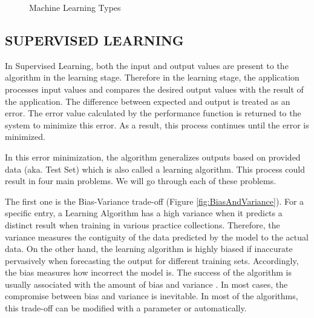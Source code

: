\begin{figure}[htbp]
\centering
{}
\caption{Machine Learning Types}
\label{fig:MachineLearningTypes}
\end{figure}

\subsection{SUPERVISED LEARNING}

In Supervised Learning, both the input and output values are present to the algorithm in the learning stage. Therefore in the learning stage, the application processes input values and compares the desired output values with the result of the application. The difference between expected and output is treated as an error. The error value calculated by the performance function is returned to the system to minimize this error. As a result, this process continues until the error is minimized.

In this error minimization, the algorithm generalizes outputs based on provided data (aka. Test Set) which is also called a learning algorithm. This process could result in four main problems. We will go through each of these problems. 

The first one is the Bias-Variance trade-off \cite{geman1992neural} (Figure \ref{fig:BiasAndVariance}). For a specific entry, a Learning Algorithm has a high variance when it predicts a distinct result when training in various practice collections. Therefore, the variance measures the contiguity of the data predicted by the model to the actual data. On the other hand, the learning algorithm is highly biased if inaccurate pervasively when forecasting the output for different training sets. Accordingly, the bias measures how incorrect the model is.  The success of the algorithm is usually associated with the amount of bias and variance \cite{james2003variance}. In most cases, the compromise between bias and variance is inevitable. In most of the algorithms, this trade-off can be modified with a parameter or automatically. 

